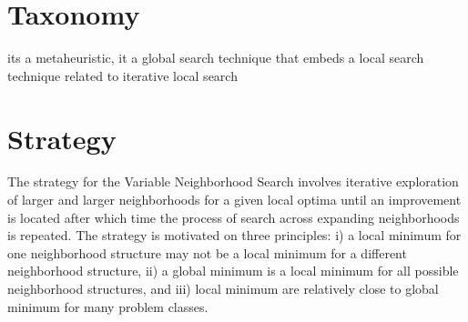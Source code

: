 \documentclass[a4paper, 11pt]{article}
\begin{document}
\section{Taxonomy}
\label{sec:taxonomy}
its a metaheuristic, it a global search technique that embeds a local search technique
related to iterative local search

\section{Strategy}
\label{sec:strategy}
The strategy for the Variable Neighborhood Search involves iterative exploration of larger and larger neighborhoods for a given local optima until an improvement is located after which time the process of search across expanding neighborhoods is repeated. 
The strategy is motivated on three principles: i) a local minimum for one neighborhood structure may not be a local minimum for a different neighborhood structure, ii) a global minimum is a local minimum for all possible neighborhood structures, and iii) local minimum are relatively close to global minimum for many problem classes.

\end{document}
